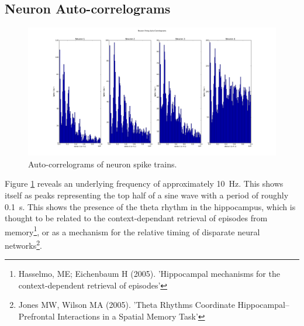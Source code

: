 \documentclass[a4paper, 10pt]{article}
\begin{document}
\subsection*{Neuron Auto-correlograms}
\begin{figure}[H]
  \centering
  \includegraphics[width=1.0\textwidth]{neuron_acorr_plot.png}
  \caption{Auto-correlograms of neuron spike trains.}
  \label{fig:acorr}
\end{figure}

Figure \ref{fig:acorr} reveals an underlying frequency of approximately
\SI{10}{\hertz}. This shows itself as peaks representing the top half of a sine
wave with a period of roughly \SI{0.1}{\second}. This shows the presence of the
theta rhythm in the hippocampus, which is thought to be related to the
context-dependant retrieval of episodes from memory\footnote{Hasselmo, ME;
  Eichenbaum H (2005). 'Hippocampal mechanisms for the context-dependent
  retrieval of episodes'}, or as a mechanism for the relative timing of
disparate neural networks\footnote{Jones MW, Wilson MA (2005). 'Theta Rhythms
  Coordinate Hippocampal–Prefrontal Interactions in a Spatial Memory Task'}.






\end{document}
